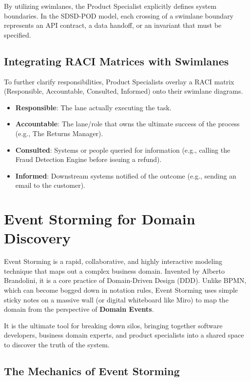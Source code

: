 By utilizing swimlanes, the Product Specialist explicitly defines system
boundaries. In the SDSD-POD model, each crossing of a swimlane boundary
represents an API contract, a data handoff, or an invariant that must be
specified.

\subsection{Integrating RACI Matrices with
Swimlanes}\label{integrating-raci-matrices-with-swimlanes}

To further clarify responsibilities, Product Specialists overlay a RACI
matrix (Responsible, Accountable, Consulted, Informed) onto their
swimlane diagrams.

\begin{itemize}
\tightlist
\item
  \textbf{Responsible}: The lane actually executing the task.
\item
  \textbf{Accountable}: The lane/role that owns the ultimate success of
  the process (e.g., The Returns Manager).
\item
  \textbf{Consulted}: Systems or people queried for information (e.g.,
  calling the Fraud Detection Engine before issuing a refund).
\item
  \textbf{Informed}: Downstream systems notified of the outcome (e.g.,
  sending an email to the customer).
\end{itemize}

\bigskip

\section{Event Storming for Domain
Discovery}\label{event-storming-for-domain-discovery}

Event Storming is a rapid, collaborative, and highly interactive
modeling technique that maps out a complex business domain. Invented by
Alberto Brandolini, it is a core practice of Domain-Driven Design (DDD).
Unlike BPMN, which can become bogged down in notation rules, Event
Storming uses simple sticky notes on a massive wall (or digital
whiteboard like Miro) to map the domain from the perspective of
\textbf{Domain Events}.

It is the ultimate tool for breaking down silos, bringing together
software developers, business domain experts, and product specialists
into a shared space to discover the truth of the system.

\subsection{The Mechanics of Event
Storming}\label{the-mechanics-of-event-storming}

